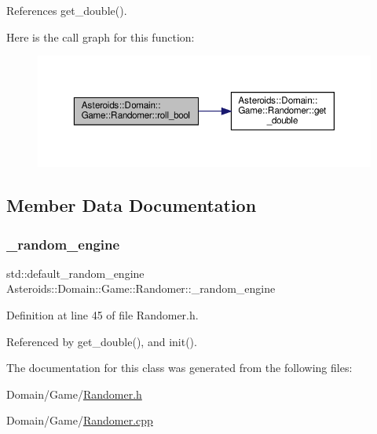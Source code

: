 References get\+\_\+double().

Here is the call graph for this function\+:\nopagebreak
\begin{figure}[H]
\begin{center}
\leavevmode
\includegraphics[width=350pt]{classAsteroids_1_1Domain_1_1Game_1_1Randomer_a9d5a2a8aeb43ade5f1a0a9a212f4dd4a_cgraph}
\end{center}
\end{figure}


\subsection{Member Data Documentation}
\mbox{\label{classAsteroids_1_1Domain_1_1Game_1_1Randomer_ab8883b05686f2c197fbe51bed15516db}} 
\subsubsection{\texorpdfstring{\+\_\+random\+\_\+engine}{\_random\_engine}}
{\footnotesize\ttfamily std\+::default\+\_\+random\+\_\+engine Asteroids\+::\+Domain\+::\+Game\+::\+Randomer\+::\+\_\+random\+\_\+engine\hspace{0.3cm}{\ttfamily [private]}}



Definition at line 45 of file Randomer.\+h.



Referenced by get\+\_\+double(), and init().



The documentation for this class was generated from the following files\+:\begin{DoxyCompactItemize}
\item 
Domain/\+Game/\hyperlink{Randomer_8h}{Randomer.\+h}\item 
Domain/\+Game/\hyperlink{Randomer_8cpp}{Randomer.\+cpp}\end{DoxyCompactItemize}
